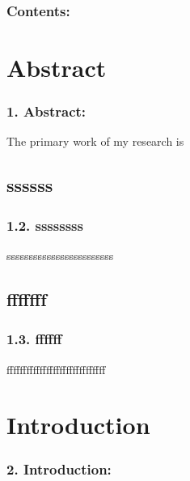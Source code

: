 \documentclass{beamer}
\begin{document}


\frame{\titlepage}

\begin{frame}[t]
    \frametitle{Contents:}
    \begin{minipage}[t][0.5cm]{\textwidth}
    \tableofcontents
    \end{minipage}
\end{frame}

\section{Abstract}
\begin{frame}
    \frametitle{\textbf{1. Abstract:}}
    The primary work of my research is 
\end{frame}

\subsection{ssssss}
\begin{frame}
    \frametitle{\textbf{1.2. ssssssss}}
    ssssssssssssssssssssssss
\end{frame}

\subsection{fffffff}
\begin{frame}
    \frametitle{\textbf{1.3. ffffff}}
    ffffffffffffffffffffffffffffff
\end{frame}

\section{Introduction}
\begin{frame}
    \frametitle{\textbf{2. Introduction:}}
\end{frame}
\end{document}
